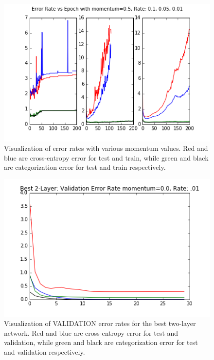 \documentclass{article}
\begin{document}
\begin{figure}[h]
  \centering
  \includegraphics[scale=0.6]{../momentum5_rate10501.png} 
  \caption{Visualization of error rates with various momentum values. Red and blue are cross-entropy error for test and train, while green and black are categorization error for test and train respectively. }
  \label{fig:momentumsrate3}
\end{figure}

\begin{figure}[h]
  \centering
  \includegraphics[scale=0.6]{../two_layer_best.png} 
  \caption{Visualization of VALIDATION error rates for the best two-layer network. Red and blue are cross-entropy error for test and validation, while green and black are categorization error for test and validation respectively. }
  \label{fig:twolayerbest}
\end{figure}
\end{document}
